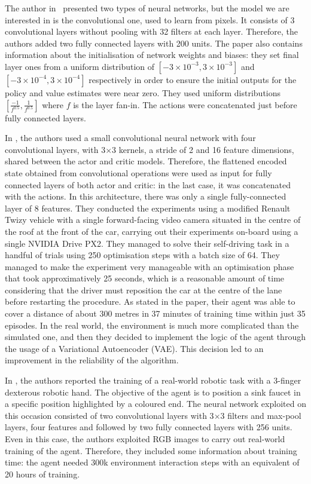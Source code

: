 The author in~\cite{lillicrap2015continuous} presented two types of neural networks, but the model we are interested in is the convolutional one, used to learn from pixels.
It consists of 3 convolutional layers without pooling with 32 filters at each layer.
Therefore, the authors added two fully connected layers with 200 units.
The paper also contains information about the initialisation of network weights and biases: they set final layer ones from a uniform distribution of $[-3\times 10^{-3},3\times 10^{-3}]$ and $[-3\times 10^{-4},3\times 10^{-4}]$ respectively in order to ensure the initial outputs for the policy and value estimates were near zero.
They used uniform distributions $[\frac{-1}{f^{0.5}}, \frac{1}{f^{0.5}}]$ where $f$ is the layer fan-in.
The actions were concatenated just before fully connected layers.

In \cite{kendall2018learning}, the authors used a small convolutional neural network with four convolutional layers, with 3$\times$3 kernels, a stride of 2 and 16 feature dimensions, shared between the actor and critic models.
Therefore, the flattened encoded state obtained from convolutional operations were used as input for fully connected layers of both actor and critic: in the last case, it was concatenated with the actions.
In this architecture, there was only a single fully-connected layer of 8 features.
They conducted the experiments using a modified Renault Twizy vehicle with a single forward-facing video camera situated in the centre of the roof at the front of the car, carrying out their experiments on-board using a single NVIDIA Drive PX2.
They managed to solve their self-driving task in a handful of trials using 250 optimisation steps with a batch size of 64.
They managed to make the experiment very manageable with an optimisation phase that took approximatively 25 seconds, which is a reasonable amount of time considering that the driver must reposition the car at the centre of the lane before restarting the procedure.
As stated in the paper, their agent was able to cover a distance of about 300 metres in 37 minutes of training time within just 35 episodes.
In the real world, the environment is much more complicated than the simulated one, and then they decided to implement the logic of the agent through the usage of a Variational Autoencoder (VAE).
This decision led to an improvement in the reliability of the algorithm.

In \cite{haarnoja2018alg}, the authors reported the training of a real-world robotic task with a 3-finger dexterous robotic hand.
The objective of the agent is to position a sink faucet in a specific position highlighted by a coloured end.
The neural network exploited on this occasion consisted of two convolutional layers with 3$\times$3 filters and max-pool layers, four features and followed by two fully connected layers with 256 units.
Even in this case, the authors exploited RGB images to carry out real-world training of the agent.
Therefore, they included some information about training time: the agent needed 300k environment interaction steps with an equivalent of 20 hours of training.

